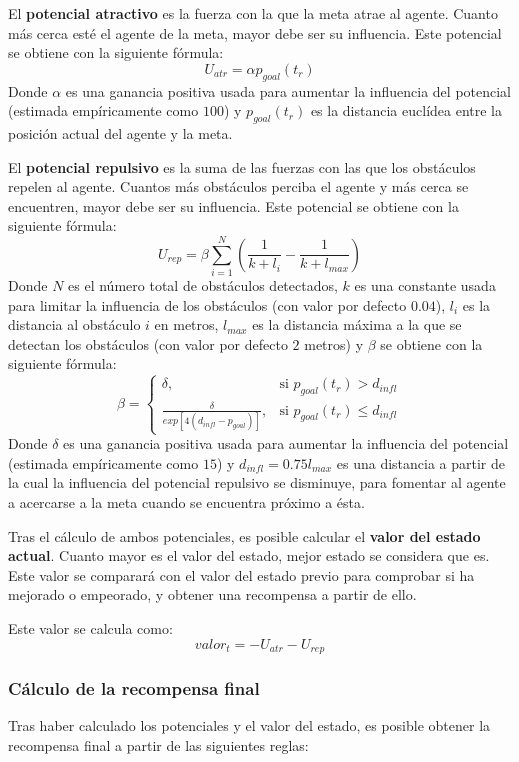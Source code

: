 El \textbf{potencial atractivo} es la fuerza con la que la meta atrae al agente. Cuanto más cerca esté el agente de la meta, mayor debe ser su influencia. Este potencial se obtiene con la siguiente fórmula:
\[U_{atr} = \alpha p_{goal}(t_r)\]
Donde $\alpha$ es una ganancia positiva usada para aumentar la influencia del potencial (estimada empíricamente como $100$) y $p_{goal}(t_r)$ es la distancia euclídea entre la posición actual del agente y la meta.

El \textbf{potencial repulsivo} es la suma de las fuerzas con las que los obstáculos repelen al agente. Cuantos más obstáculos perciba el agente y más cerca se encuentren, mayor debe ser su influencia. Este potencial se obtiene con la siguiente fórmula:
\[U_{rep} = \beta \sum_{i=1}^{N}(\frac{1}{k+l_i}-\frac{1}{k+l_{max}})\]
Donde $N$ es el número total de obstáculos detectados, $k$ es una constante usada para limitar la influencia de los obstáculos (con valor por defecto $0.04$), $l_i$ es la distancia al obstáculo $i$ en metros, $l_{max}$ es la distancia máxima a la que se detectan los obstáculos (con valor por defecto $2$ metros) y $\beta$ se obtiene con la siguiente fórmula:
\[
\beta = 
\begin{cases}
\delta,& \text{si } p_{goal}(t_r) > d_{infl}\\
\frac{\delta}{exp[4(d_{infl}-p_{goal})]},& \text{si } p_{goal}(t_r) \leq d_{infl}
\end{cases}
\]
Donde $\delta$ es una ganancia positiva usada para aumentar la influencia del potencial (estimada empíricamente como $15$) y $d_{infl}=0.75 l_{max}$ es una distancia a partir de la cual la influencia del potencial repulsivo se disminuye, para fomentar al agente a acercarse a la meta cuando se encuentra próximo a ésta.

Tras el cálculo de ambos potenciales, es posible calcular el \textbf{valor del estado actual}. Cuanto mayor es el valor del estado, mejor estado se considera que es. Este valor se comparará con el valor del estado previo para comprobar si ha mejorado o empeorado, y obtener una recompensa a partir de ello.

Este valor se calcula como:
\[valor_t=-U_{atr}-U_{rep}\]

\subsubsection{Cálculo de la recompensa final}
 
Tras haber calculado los potenciales y el valor del estado, es posible obtener la recompensa final a partir de las siguientes reglas:

